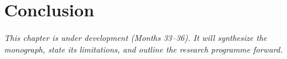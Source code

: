 \chapter{Conclusion}
\label{ch:conclusion}

\textit{This chapter is under development (Months 33--36). It will synthesize the
monograph, state its limitations, and outline the research programme forward.}
